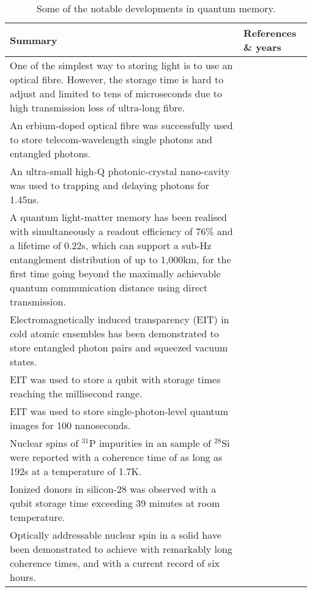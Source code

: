 \begin{table*}[!htbp]
	\begin{tabular}{|p{0.755\linewidth}|p{0.22\linewidth}|}
		\hline
		Summary & References \& years \\
		\hline \hline
		One of the simplest way to storing light is to use an optical fibre. However, the storage time is hard to adjust and limited to tens of microseconds due to high transmission loss of ultra-long fibre.  & \cite{bib:landry2007quantum, bib:lvovsky2009optical} \\
		\hline
		An erbium-doped optical fibre was successfully used to store telecom-wavelength single photons and entangled photons. & \cite{bib:saglamyurek2015quantum,  bib:jin2015telecom} \\
		\hline
		An ultra-small high-Q photonic-crystal nano-cavity was used to trapping and delaying photons for 1.45ns. & \cite{bib:tanabe2007trapping} \\
		\hline
		A quantum light-matter memory has been realised with simultaneously a readout efficiency of 76\% and a lifetime of 0.22s, which can support a sub-Hz entanglement distribution of up to 1,000km, for the first time going beyond the maximally achievable quantum communication distance using direct transmission. &  \cite{bib:yang2016efficient}\\
		\hline
		Electromagnetically induced transparency (EIT) in cold atomic ensembles has been demonstrated to store entangled photon pairs and squeezed vacuum states. & \cite{bib:Choi2008mapping, bib:appel2008quantum, bib:honda2008storage} \\
		\hline
		EIT was used to store a qubit with storage times reaching the millisecond range. & \cite{bib:lettner2011remote,  bib:riedl2012bose, bib:xu2013long} \\
		\hline
		EIT was used to store single-photon-level quantum images for 100 nanoseconds. & \cite{bib:ding2013single} \\
		\hline
        Nuclear spins of ${}^{31}$P impurities in an sample of ${}^{28}$Si were reported with a coherence time of as long as 192s at a temperature of 1.7K. & \cite{bib:steger2012quantum} \\
        \hline
        Ionized donors in silicon-28 was observed with a qubit storage time exceeding 39 minutes at room temperature. & \cite{bib:saeedi2013room} \\
        \hline
        Optically addressable nuclear spin in a solid have been demonstrated to achieve with remarkably long coherence times, and with a current record of six hours. & \cite{bib:zhong2015optically} \\
        \hline
	\end{tabular}
	\captionspacetab \caption{Some of the notable developments in quantum memory.} \label{tab:memory}
\end{table*}

